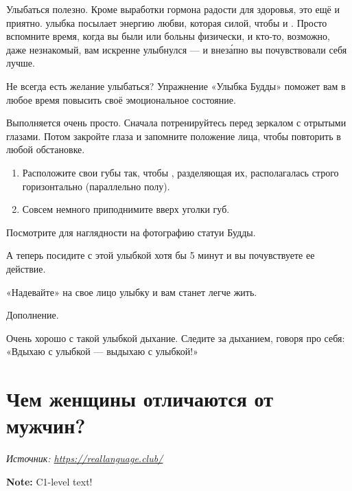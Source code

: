 Улыбаться полезно. Кроме выработки гормона радости для здоровья, это ещё и приятно.
 улыбка посылает энергию любви,
которая  силой, чтобы  и . Просто вспомните время, когда вы были  или больны физически, и кто-то, возможно, даже незнакомый, вам искренне улыбнулся --- и внез\'{а}пно вы почувствовали себя лучше.

Не всегда есть желание улыбаться? Упражнение «Улыбка Будды» поможет вам в любое время повысить своё эмоциональное состояние.

Выполняется очень просто. Сначала потренируйтесь перед зеркалом с отрытыми глазами.
Потом закройте глаза и запомните положение  лица,
чтобы повторить в любой обстановке.

\begin{enumerate}[noitemsep]
    \item Расположите свои губы так, чтобы ,
          разделяющая их, располагалась строго горизонтально (параллельно полу).
    \item Совсем немного приподнимите вверх уголки губ.
\end{enumerate}

Посмотрите для наглядности на фотографию статуи Будды.

А теперь посидите с этой улыбкой хотя бы 5 минут и вы почувствуете ее действие.

«Надевайте» на свое лицо улыбку и вам станет легче жить.

Дополнение.

Очень хорошо с такой улыбкой  дыхание.
Следите за дыханием, говоря про себя: «Вдыхаю с улыбкой --- выдыхаю с улыбкой!»



\newpage
\section{Чем женщины отличаются от мужчин?}

\textit{Источник: \url{https://reallanguage.club/}}

\textbf{Note:} C1-level text!


